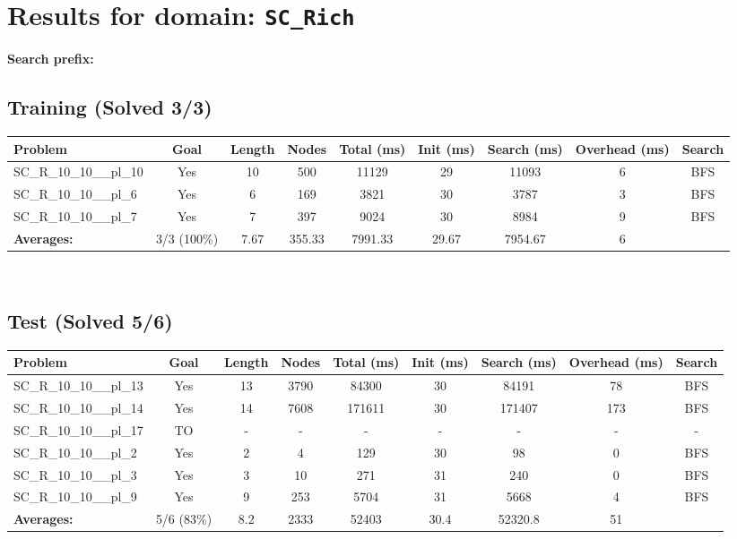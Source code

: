 \documentclass{article}
\begin{document}
\section*{Results for domain: \texttt{SC\_Rich}}
\textbf{Search prefix:} 
\\[0.5cm]
\subsection*{Training (Solved 3/3)}
\begin{tabular}{lcccccccc}
\toprule
Problem & Goal & Length & Nodes & Total (ms) & Init (ms) & Search (ms) & Overhead (ms) & Search \\
\midrule
SC\_R\_10\_10\_\_pl\_10 & Yes & 10 & 500 & 11129 & 29 & 11093 & 6 & BFS \\
SC\_R\_10\_10\_\_pl\_6 & Yes & 6 & 169 & 3821 & 30 & 3787 & 3 & BFS \\
SC\_R\_10\_10\_\_pl\_7 & Yes & 7 & 397 & 9024 & 30 & 8984 & 9 & BFS \\
\textbf{Averages:} & 3/3 (100\%) & 7.67 & 355.33 & 7991.33 & 29.67 & 7954.67 & 6 & \\
\bottomrule
\end{tabular}
\\[0.7cm]
\subsection*{Test (Solved 5/6)}
\begin{tabular}{lcccccccc}
\toprule
Problem & Goal & Length & Nodes & Total (ms) & Init (ms) & Search (ms) & Overhead (ms) & Search \\
\midrule
SC\_R\_10\_10\_\_pl\_13 & Yes & 13 & 3790 & 84300 & 30 & 84191 & 78 & BFS \\
SC\_R\_10\_10\_\_pl\_14 & Yes & 14 & 7608 & 171611 & 30 & 171407 & 173 & BFS \\
SC\_R\_10\_10\_\_pl\_17 & TO & - & - & - & - & - & - & - \\
SC\_R\_10\_10\_\_pl\_2 & Yes & 2 & 4 & 129 & 30 & 98 & 0 & BFS \\
SC\_R\_10\_10\_\_pl\_3 & Yes & 3 & 10 & 271 & 31 & 240 & 0 & BFS \\
SC\_R\_10\_10\_\_pl\_9 & Yes & 9 & 253 & 5704 & 31 & 5668 & 4 & BFS \\
\textbf{Averages:} & 5/6 (83\%) & 8.2 & 2333 & 52403 & 30.4 & 52320.8 & 51 & \\
\bottomrule
\end{tabular}
\\[0.7cm]
\end{document}
